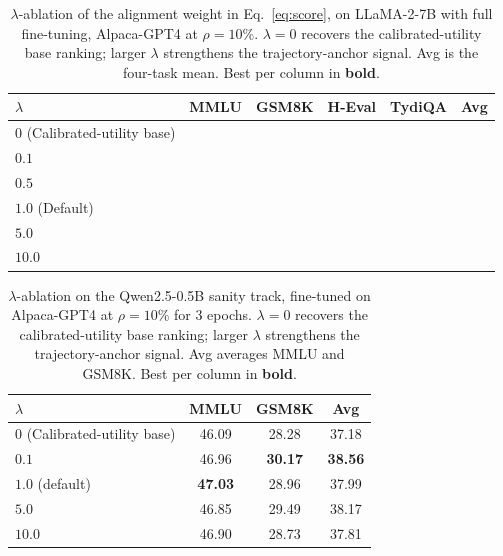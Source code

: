 \begin{table}[t]
\centering
\caption{$\lambda$-ablation of the alignment weight in
Eq.~\ref{eq:score}, on LLaMA-2-7B with full fine-tuning, Alpaca-GPT4
at $\rho=10\%$. $\lambda=0$ recovers the calibrated-utility base
ranking; larger $\lambda$ strengthens the trajectory-anchor signal.
Avg is the four-task mean. Best per column in \textbf{bold}.}
\label{tab:lambda-7b}
\begin{tabular}{lccccc}
\toprule
$\lambda$ & MMLU & GSM8K & H-Eval & TydiQA & Avg \\
\midrule
$0$ (Calibrated-utility base) & \STATUS{??.??} & \STATUS{??.??} & \STATUS{??.??} & \STATUS{??.??} & \STATUS{??.??} \\
$0.1$                & \STATUS{??.??} & \STATUS{??.??} & \STATUS{??.??} & \STATUS{??.??} & \STATUS{??.??} \\
$0.5$                & \STATUS{??.??} & \STATUS{??.??} & \STATUS{??.??} & \STATUS{??.??} & \STATUS{??.??} \\
$1.0$ (Default)      & \STATUS{??.??} & \STATUS{??.??} & \STATUS{??.??} & \STATUS{??.??} & \STATUS{??.??} \\
$5.0$                & \STATUS{??.??} & \STATUS{??.??} & \STATUS{??.??} & \STATUS{??.??} & \STATUS{??.??} \\
$10.0$               & \STATUS{??.??} & \STATUS{??.??} & \STATUS{??.??} & \STATUS{??.??} & \STATUS{??.??} \\
\bottomrule
\end{tabular}
\end{table}

\begin{table}[t]
\centering
\caption{$\lambda$-ablation on the Qwen2.5-0.5B sanity track,
fine-tuned on Alpaca-GPT4 at $\rho=10\%$ for 3 epochs.
$\lambda=0$ recovers the calibrated-utility base ranking;
larger $\lambda$ strengthens the trajectory-anchor signal. Avg
averages MMLU and GSM8K. Best per column in \textbf{bold}.}
\label{tab:lambda-05b}
\begin{tabular}{lccc}
\toprule
$\lambda$ & MMLU & GSM8K & Avg \\
\midrule
$0$ (Calibrated-utility base) & 46.09 & 28.28 & 37.18 \\
$0.1$                & 46.96 & \textbf{30.17} & \textbf{38.56} \\
$1.0$ (default)      & \textbf{47.03} & 28.96 & 37.99 \\
$5.0$                & 46.85 & 29.49 & 38.17 \\
$10.0$               & 46.90 & 28.73 & 37.81 \\
\bottomrule
\end{tabular}
\end{table}

